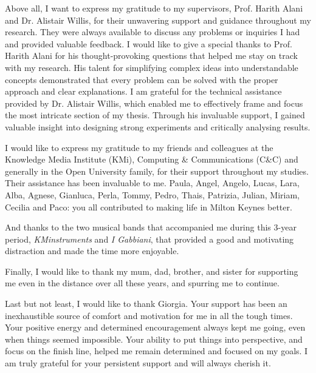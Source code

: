 Above all, I want to express my gratitude to my supervisors, Prof. Harith Alani and Dr. Alistair Willis, for their unwavering support and guidance throughout my research. They were always available to discuss any problems or inquiries I had and provided valuable feedback.
I would like to give a special thanks to Prof. Harith Alani for his thought-provoking questions that helped me stay on track with my research. His talent for simplifying complex ideas into understandable concepts demonstrated that every problem can be solved with the proper approach and clear explanations.
I am grateful for the technical assistance provided by Dr. Alistair Willis, which enabled me to effectively frame and focus the most intricate section of my thesis. Through his invaluable support, I gained valuable insight into designing strong experiments and critically analysing results.


I would like to express my gratitude to my friends and colleagues at the Knowledge Media Institute (KMi), Computing \& Communications (C\&C) and generally in the Open University family, for their support throughout my studies. Their assistance has been invaluable to me. Paula, Angel, Angelo, Lucas, Lara, Alba, Agnese, Gianluca, Perla, Tommy, Pedro, Thais, Patrizia, Julian, Miriam, Cecilia and Paco: you all contributed to making life in Milton Keynes better.

And thanks to the two musical bands that accompanied me during this 3-year period, \emph{KMinstruments} and \emph{I Gabbiani}, that provided a good and motivating distraction and made the time more enjoyable. 

Finally, I would like to thank my mum, dad, brother, and sister for supporting me even in the distance over all these years, and spurring me to continue.%

Last but not least, I would like to thank Giorgia.
Your support has been an inexhaustible source of comfort and motivation for me in all the tough times. Your positive energy and determined encouragement always kept me going, even when things seemed impossible. Your ability to put things into perspective, and focus on the finish line, helped me remain determined and focused on my goals. I am truly grateful for your persistent support and will always cherish it.

